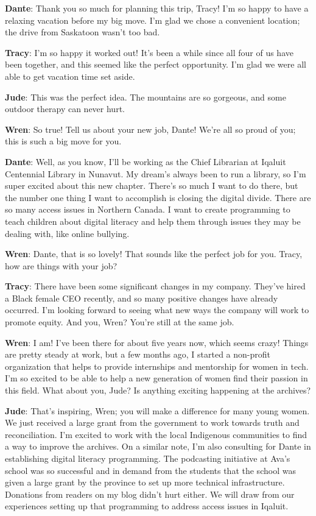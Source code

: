 \documentclass[
  letterpaper,
  DIV=11,
  numbers=noendperiod]{scrreprt}
\begin{document}
\textbf{Dante}: Thank you so much for planning this trip, Tracy! I'm so
happy to have a relaxing vacation before my big move. I'm glad we chose
a convenient location; the drive from Saskatoon wasn't too bad.

\textbf{Tracy}: I'm so happy it worked out! It's been a while since all
four of us have been together, and this seemed like the perfect
opportunity. I'm glad we were all able to get vacation time set aside.

\textbf{Jude}: This was the perfect idea. The mountains are so gorgeous,
and some outdoor therapy can never hurt.

\textbf{Wren}: So true! Tell us about your new job, Dante! We're all so
proud of you; this is such a big move for you.

\textbf{Dante}: Well, as you know, I'll be working as the Chief
Librarian at Iqaluit Centennial Library in Nunavut. My dream's always
been to run a library, so I'm super excited about this new chapter.
There's so much I want to do there, but the number one thing I want to
accomplish is closing the digital divide. There are so many access
issues in Northern Canada. I want to create programming to teach
children about digital literacy and help them through issues they may be
dealing with, like online bullying.

\textbf{Wren}: Dante, that is so lovely! That sounds like the perfect
job for you. Tracy, how are things with your job?

\textbf{Tracy}: There have been some significant changes in my company.
They've hired a Black female CEO recently, and so many positive changes
have already occurred. I'm looking forward to seeing what new ways the
company will work to promote equity. And you, Wren? You're still at the
same job.

\textbf{Wren}: I am! I've been there for about five years now, which
seems crazy! Things are pretty steady at work, but a few months ago, I
started a non-profit organization that helps to provide internships and
mentorship for women in tech. I'm so excited to be able to help a new
generation of women find their passion in this field. What about you,
Jude? Is anything exciting happening at the archives?

\textbf{Jude}: That's inspiring, Wren; you will make a difference for
many young women. We just received a large grant from the government to
work towards truth and reconciliation. I'm excited to work with the
local Indigenous communities to find a way to improve the archives. On a
similar note, I'm also consulting for Dante in establishing digital
literacy programming. The podcasting initiative at Ava's school was so
successful and in demand from the students that the school was given a
large grant by the province to set up more technical infrastructure.
Donations from readers on my blog didn't hurt either. We will draw from
our experiences setting up that programming to address access issues in
Iqaluit.
\end{document}
